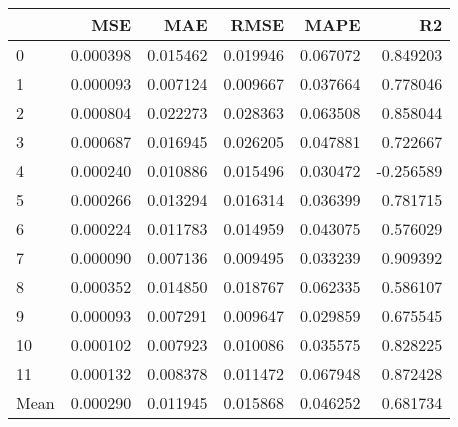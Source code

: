 \begin{tabular}{lrrrrr}
\toprule
 & MSE & MAE & RMSE & MAPE & R2 \\
\midrule
0 & 0.000398 & 0.015462 & 0.019946 & 0.067072 & 0.849203 \\
1 & 0.000093 & 0.007124 & 0.009667 & 0.037664 & 0.778046 \\
2 & 0.000804 & 0.022273 & 0.028363 & 0.063508 & 0.858044 \\
3 & 0.000687 & 0.016945 & 0.026205 & 0.047881 & 0.722667 \\
4 & 0.000240 & 0.010886 & 0.015496 & 0.030472 & -0.256589 \\
5 & 0.000266 & 0.013294 & 0.016314 & 0.036399 & 0.781715 \\
6 & 0.000224 & 0.011783 & 0.014959 & 0.043075 & 0.576029 \\
7 & 0.000090 & 0.007136 & 0.009495 & 0.033239 & 0.909392 \\
8 & 0.000352 & 0.014850 & 0.018767 & 0.062335 & 0.586107 \\
9 & 0.000093 & 0.007291 & 0.009647 & 0.029859 & 0.675545 \\
10 & 0.000102 & 0.007923 & 0.010086 & 0.035575 & 0.828225 \\
11 & 0.000132 & 0.008378 & 0.011472 & 0.067948 & 0.872428 \\
Mean & 0.000290 & 0.011945 & 0.015868 & 0.046252 & 0.681734 \\
\bottomrule
\end{tabular}
